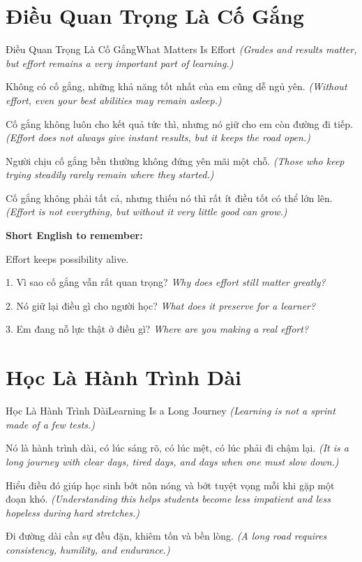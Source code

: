 \section{Điều Quan Trọng Là Cố Gắng}
\begin{truyen}{Điều Quan Trọng Là Cố Gắng}{What Matters Is Effort}
\textit{(Grades and results matter, but effort remains a very important part of learning.)}

Không có cố gắng, những khả năng tốt nhất của em cũng dễ ngủ yên.
\textit{(Without effort, even your best abilities may remain asleep.)}

Cố gắng không luôn cho kết quả tức thì, nhưng nó giữ cho em còn đường đi tiếp.
\textit{(Effort does not always give instant results, but it keeps the road open.)}

Người chịu cố gắng bền thường không đứng yên mãi một chỗ.
\textit{(Those who keep trying steadily rarely remain where they started.)}
\end{truyen}

\begin{baihoc}
Cố gắng không phải tất cả, nhưng thiếu nó thì rất ít điều tốt có thể lớn lên.
\textit{(Effort is not everything, but without it very little good can grow.)}
\end{baihoc}

\begin{ghinhoanh}
\textbf{Short English to remember:}

Effort keeps possibility alive.

\end{ghinhoanh}

\begin{tuhocnhanh}
1. Vì sao cố gắng vẫn rất quan trọng? \textit{Why does effort still matter greatly?}

2. Nó giữ lại điều gì cho người học? \textit{What does it preserve for a learner?}

3. Em đang nỗ lực thật ở điều gì? \textit{Where are you making a real effort?}
\end{tuhocnhanh}
\ngancach

\section{Học Là Hành Trình Dài}
\begin{truyen}{Học Là Hành Trình Dài}{Learning Is a Long Journey}
\textit{(Learning is not a sprint made of a few tests.)}

Nó là hành trình dài, có lúc sáng rõ, có lúc mệt, có lúc phải đi chậm lại.
\textit{(It is a long journey with clear days, tired days, and days when one must slow down.)}

Hiểu điều đó giúp học sinh bớt nôn nóng và bớt tuyệt vọng mỗi khi gặp một đoạn khó.
\textit{(Understanding this helps students become less impatient and less hopeless during hard stretches.)}

Đi đường dài cần sự đều đặn, khiêm tốn và bền lòng.
\textit{(A long road requires consistency, humility, and endurance.)}
\end{truyen}

